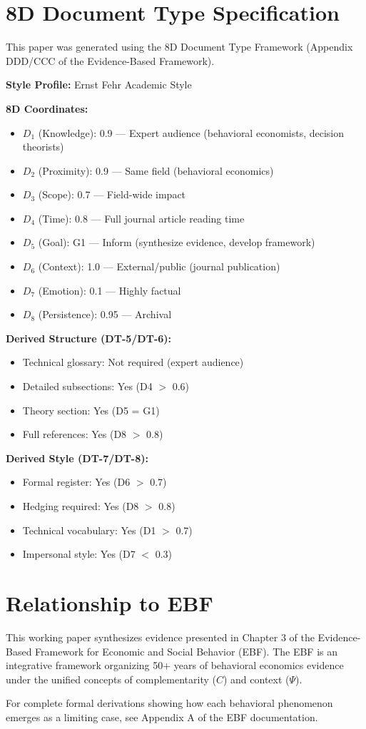 \documentclass[12pt]{article}
\begin{document}
\appendix
\section{8D Document Type Specification}
\label{app:8d}

This paper was generated using the 8D Document Type Framework (Appendix DDD/CCC of the Evidence-Based Framework).

\textbf{Style Profile:} Ernst Fehr Academic Style

\textbf{8D Coordinates:}
\begin{itemize}
    \item $D_1$ (Knowledge): 0.9 --- Expert audience (behavioral economists, decision theorists)
    \item $D_2$ (Proximity): 0.9 --- Same field (behavioral economics)
    \item $D_3$ (Scope): 0.7 --- Field-wide impact
    \item $D_4$ (Time): 0.8 --- Full journal article reading time
    \item $D_5$ (Goal): G1 --- Inform (synthesize evidence, develop framework)
    \item $D_6$ (Context): 1.0 --- External/public (journal publication)
    \item $D_7$ (Emotion): 0.1 --- Highly factual
    \item $D_8$ (Persistence): 0.95 --- Archival
\end{itemize}

\textbf{Derived Structure (DT-5/DT-6):}
\begin{itemize}
    \item Technical glossary: Not required (expert audience)
    \item Detailed subsections: Yes (D4 $>$ 0.6)
    \item Theory section: Yes (D5 = G1)
    \item Full references: Yes (D8 $>$ 0.8)
\end{itemize}

\textbf{Derived Style (DT-7/DT-8):}
\begin{itemize}
    \item Formal register: Yes (D6 $>$ 0.7)
    \item Hedging required: Yes (D8 $>$ 0.8)
    \item Technical vocabulary: Yes (D1 $>$ 0.7)
    \item Impersonal style: Yes (D7 $<$ 0.3)
\end{itemize}

\section{Relationship to EBF}
\label{app:ebf}

This working paper synthesizes evidence presented in Chapter 3 of the Evidence-Based Framework for Economic and Social Behavior (EBF). The EBF is an integrative framework organizing 50+ years of behavioral economics evidence under the unified concepts of complementarity ($C$) and context ($\Psi$).

For complete formal derivations showing how each behavioral phenomenon emerges as a limiting case, see Appendix A of the EBF documentation.
\end{document}
